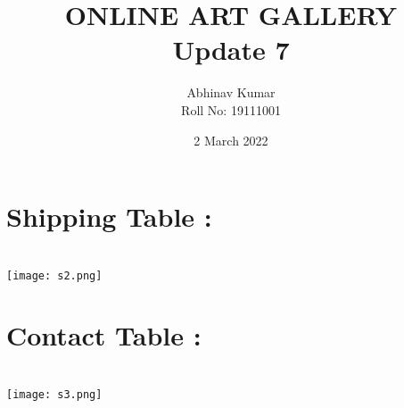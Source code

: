 \documentclass{article}
\title{ONLINE ART GALLERY \\ Update 7}
\date{2 March 2022}
\author{Abhinav Kumar \\ Roll No: 19111001 }
\begin{document}
\maketitle
\section*{Shipping Table : }
\\
\texttt{[image: s2.png]}
\section*{Contact Table : }
\\
\texttt{[image: s3.png]}
\end{document}
